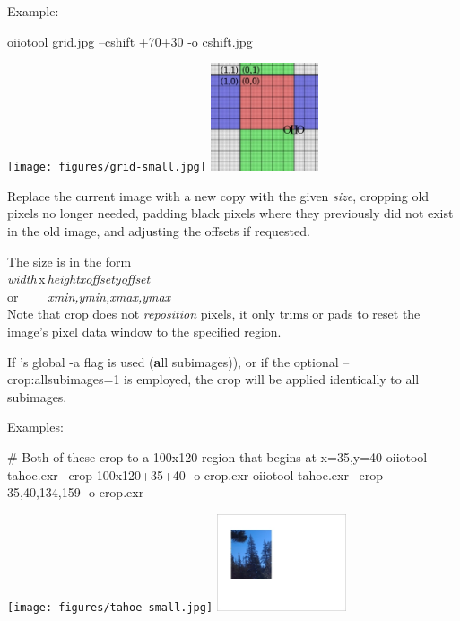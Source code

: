\noindent Example:
\begin{code}
    oiiotool grid.jpg --cshift +70+30 -o cshift.jpg
\end{code}
\spc \texttt{[image: figures/grid-small.jpg]} 
\raisebox{40pt}{\large $\rightarrow$}
\includegraphics[width=1.25in]{figures/cshift.jpg} \\
\apiend

Replace the current image with a new copy with the given \emph{size},
cropping old pixels no longer needed, padding black pixels where they
previously did not exist in the old image, and adjusting the offsets
if requested.

The size is in the form 
\\ \spc\spc \emph{width}\,{\cf x}\,\emph{height}{\cf [+-]}\emph{xoffset}{\cf
  [+-]}\emph{yoffset}
\\ or~~~~ \spc \emph{xmin,ymin,xmax,ymax} \\


Note that {\cf crop} does not \emph{reposition} pixels, it only trims or
pads to reset the image's pixel data window to the specified region.

If \oiiotool's global {\cf -a} flag is used ({\bf a}ll subimages)), or if the
optional {\cf --crop:allsubimages=1} is employed, the crop will be applied
identically to all subimages.

\noindent Examples:

\begin{code}
    # Both of these crop to a 100x120 region that begins at x=35,y=40
    oiiotool tahoe.exr --crop 100x120+35+40 -o crop.exr
    oiiotool tahoe.exr --crop 35,40,134,159 -o crop.exr
\end{code}

\hspace{0.4in} \texttt{[image: figures/tahoe-small.jpg]}
\raisebox{40pt}{\large $\rightarrow$}
 \includegraphics[width=1.5in]{figures/crop.jpg}
\apiend

